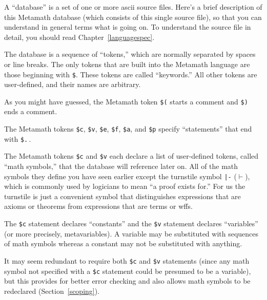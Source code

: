 A ``database'' is a set of one or more {\sc ascii} source
files.  Here's a brief description of this Metamath database
(which consists of this single source file), so that you can understand in
general terms what is going on.  To understand the source file in detail, you
should read Chapter~\ref{languagespec}.

The database is a sequence of ``tokens,'' which are normally
separated by spaces or line breaks.  The only tokens that are built into
the Metamath language are those beginning with \texttt{\$}.  These tokens
are called ``keywords.''  All other tokens are
user-defined, and their names are arbitrary.

As you might have guessed, the Metamath token \texttt{\$(} starts a comment and \texttt{\$)} ends a comment.

The Metamath tokens \texttt{\$c},
\texttt{\$v},
\texttt{\$e},
\texttt{\$f},
\texttt{\$a}, and
\texttt{\$p} specify ``statements'' that
end with \texttt{\$.}\,.

The Metamath tokens \texttt{\$c} and \texttt{\$v} each declare a list of user-defined tokens, called
``math symbols,'' that the database will reference later
on.  All of the math symbols they define you have seen earlier except the
turnstile symbol \texttt{|-} ($\vdash$), which is
commonly used by logicians to mean ``a proof exists for.''  For us
the turnstile is just a
convenient symbol that distinguishes expressions that are axioms
or theorems from expressions that are terms or wffs.

The \texttt{\$c} statement declares ``constants'' and
the \texttt{\$v} statement declares
``variables'' (or more precisely, metavariables).  A
variable may be substituted with sequences of math symbols whereas a constant may not
be substituted with anything.

It may seem redundant to require both \texttt{\$c} and
\texttt{\$v} statements (since any math
symbol not specified with a \texttt{\$c} statement could be
presumed to be a variable), but this provides for better error checking and
also allows math symbols to be redeclared
(Section~\ref{scoping}).

